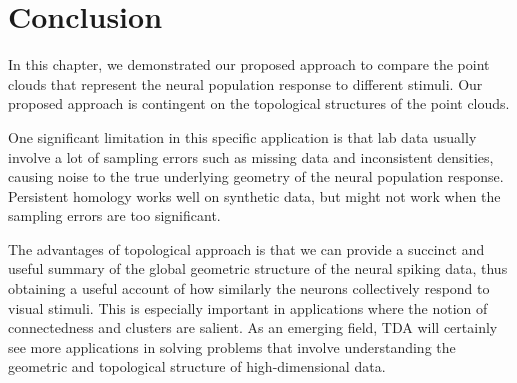 \section{Conclusion}
In this chapter, we demonstrated our proposed approach to compare the point clouds that represent the neural population response to different stimuli. Our proposed approach is contingent on the topological structures of the point clouds.  

One significant limitation in this specific application is that lab data usually involve a lot of sampling errors such as missing data and inconsistent densities, causing noise to the true underlying geometry of the neural population response. Persistent homology works well on synthetic data, but might not work when the sampling errors are too significant.

The advantages of topological approach is that we can provide a succinct and useful summary of the global geometric structure of the neural spiking data, thus obtaining a useful account of how similarly the neurons collectively respond to visual stimuli. This is especially important in applications where the notion of connectedness and clusters are salient. As an emerging field, TDA will certainly see more applications in solving problems that involve understanding the geometric and topological structure of high-dimensional data.